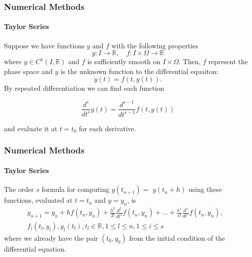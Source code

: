 \documentclass{beamer}
\newcommand{\RR}{\mathbb{R}}
\begin{document}
\begin{frame}
\frametitle{Numerical Methods}
\framesubtitle{Taylor Series}

Suppose we have functions $y$ and $f$ with the following properties
\begin{equation}
y:I \rightarrow \RR, \quad f:I \times \Omega \rightarrow \RR \nonumber
\end{equation}
where $y \in C^1(I,\RR)$ and $f$ is sufficiently smooth on $I \times \Omega$. Then, $f$ represent the phase space and $y$ is the unknown function to the differential equaiton:
\begin{equation}
\dot{y}(t) = f(t, y(t)).
\end{equation}
By repeated differentiation we can find each function

\begin{equation}
\frac{d^s}{dt^s}y(t) = \frac{d^{s-1}}{dt^{s-1}}f(t, y(t))
\end{equation}

and evaluate it at $t=t_0$ for each derivative.
\end{frame}


\begin{frame}
\frametitle{Numerical Methods}
\framesubtitle{Taylor Series}

The order $s$ formula for computing $y(t_{n+1})=$ $y(t_{n}+h)$ using these functions, evaluated at $t=t_{n}$ and $y=y_{n}$, is
\begin{eqnarray}
y_{n+1} = y_{n} + h f(t_{n}, y_{n}) + \frac{h^2}{2!} \frac{d^2}{dt^2} f(t_{n}, y_{n}) + ... + \frac{h^s}{s!} \frac{d^s}{dt^s} f(t_{n}, y_{n}), &\nonumber\\ 
f_i(t_l, y_l), y_l(t_l), t_l \in \RR, 1 \leq l \leq n, 1 \leq i \leq s
\end{eqnarray}
where we already have the pair $(t_0, y_0)$ from the initial condition of the differential equation.

\end{frame}

\end{document}
